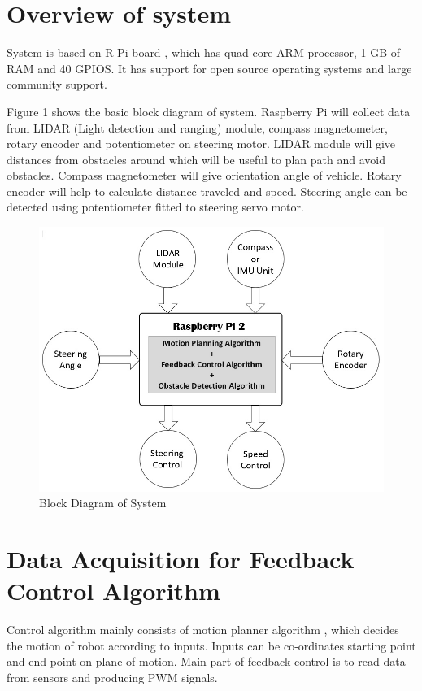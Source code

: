 \documentclass[conference]{IEEEtran}
\begin{document}
\section{Overview of system}
System is based on R Pi board \cite{paper10}, which has quad core ARM processor, 1 GB of RAM and 40 GPIOS. It has support for open source operating systems and large community support.

Figure 1 shows the basic block diagram of system. Raspberry Pi will collect data from LIDAR (Light detection and ranging) module, compass magnetometer, rotary encoder and potentiometer on steering motor. 
LIDAR module will give distances from obstacles around which will be useful to plan path and avoid obstacles. 
Compass magnetometer will give orientation angle of vehicle. 
Rotary encoder will help to calculate distance traveled and speed. 
Steering angle can be detected using potentiometer fitted to steering servo motor.

\begin{figure}[h]
\centering
\includegraphics[width=1\linewidth]{block_diagram}
\caption{Block Diagram of System}
\end{figure}

\section{Data Acquisition for Feedback Control Algorithm}
Control algorithm mainly consists of motion planner algorithm \cite{paper1} \cite{paper2}, which decides the motion of robot according to inputs. Inputs can be co-ordinates starting point and end point on plane of motion. Main part of feedback control is to read data from sensors and producing PWM signals.
\end{document}
